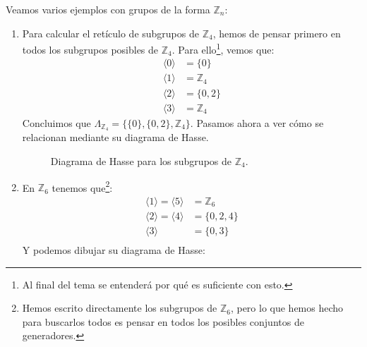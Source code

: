 \begin{ejemplo}
    Veamos varios ejemplos con grupos de la forma $\mathbb{Z}_n$:
    \begin{enumerate}
        \item Para calcular el retículo de subgrupos de $\mathbb{Z}_4$, hemos de pensar primero en todos los subgrupos posibles de $\mathbb{Z}_4$. Para ello\footnote{Al final del tema se entenderá por qué es suficiente con esto.}, vemos que:
            \begin{align*}
                \langle {0} \rangle &= \{{0}\} \\
                \langle {1} \rangle &= \mathbb{Z}_4 \\
                \langle {2} \rangle &= \{{0},{2}\} \\
                \langle {3} \rangle &= \mathbb{Z}_4 
            \end{align*}
            Concluimos que $\Lambda_{\mathbb{Z}_4} = \{\{{0}\}, \{{0},{2}\}, \mathbb{Z}_4\}$. Pasamos ahora a ver cómo se relacionan mediante su diagrama de Hasse.
            \begin{figure}[H]
                \centering
                \caption{Diagrama de Hasse para los subgrupos de $\mathbb{Z}_4$.}
                \label{fig:hasse_z4}
            \end{figure}
        \item En $\mathbb{Z}_6$ tenemos que\footnote{Hemos escrito directamente los subgrupos de $\mathbb{Z}_6$, pero lo que hemos hecho para buscarlos todos es pensar en todos los posibles conjuntos de generadores.}:
            \begin{align*}
                \langle {1} \rangle  = \langle {5} \rangle  &= \mathbb{Z}_6 \\
                \langle {2} \rangle = \langle {4} \rangle  &= \{0, 2, 4\} \\
                \langle {3} \rangle  &= \{0,3\} \\
            \end{align*}
            Y podemos dibujar su diagrama de Hasse:


\end{enumerate}
\end{ejemplo}
